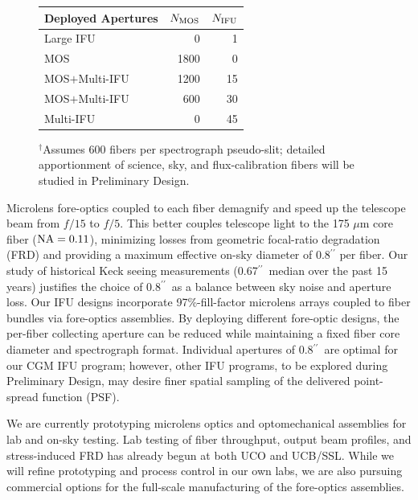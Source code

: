 \documentclass[oneside,11pt]{amsart}
\newcommand{\arcsec}{\mbox{$^{\prime\prime}$}}
\begin{document}
\begin{figure}
\begin{threeparttable}
\label{tab:sampling}
\begin{tabular}{l | r r }
\hline
Deployed Apertures  & $N_{\rm MOS}$ &  $N_{\rm IFU}$ \\
\hline
Large IFU           &     0 &      1  \\
MOS                 &  1800 &      0  \\
MOS$+$Multi-IFU     &  1200 &     15  \\
MOS$+$Multi-IFU     &   600 &     30  \\
Multi-IFU           &     0 &     45  \\
\hline
\end{tabular}
\begin{footnotesize}
\begin{tablenotes}
\item $^\dagger$Assumes 600 fibers per spectrograph pseudo-slit; detailed apportionment of science, sky, and flux-calibration fibers will be studied in Preliminary Design.
\end{tablenotes}
\end{footnotesize}
\end{threeparttable}
\end{figure}

Microlens fore-optics coupled to each fiber demagnify and speed up the telescope beam from $f/15$ to $f/5$. This better couples telescope light to the 175 $\mu$m core fiber (${\rm NA} = 0.11$), minimizing losses from geometric focal-ratio degradation (FRD) and providing a maximum effective on-sky diameter of $0.8\arcsec$ per fiber.  Our study of historical Keck seeing measurements (0.67\arcsec\ median over the past 15 years) justifies the choice of 0.8\arcsec\ as a balance between sky noise and aperture loss.
Our IFU designs incorporate 97\%-fill-factor microlens arrays coupled to fiber bundles via fore-optics assemblies.  By deploying different fore-optic designs, 
the per-fiber collecting aperture can be reduced while maintaining a fixed fiber core diameter and spectrograph format.  Individual apertures of 0.8\arcsec\ are optimal for our CGM IFU program; however, other IFU programs, to be explored during Preliminary Design, may desire finer spatial sampling of the delivered point-spread function (PSF).

We are currently prototyping microlens optics and optomechanical assemblies for lab and on-sky testing. Lab testing of fiber throughput, output beam profiles, and stress-induced FRD has already begun at both UCO and UCB/SSL.  While we will refine prototyping and process control in our own labs, we are also pursuing commercial options for the full-scale manufacturing of the fore-optics assemblies.
\end{document}
